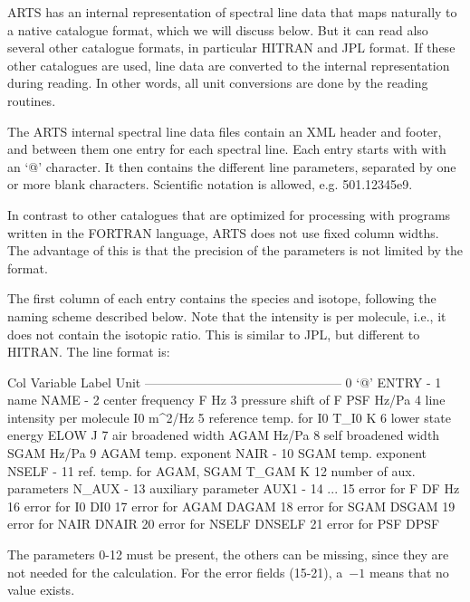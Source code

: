 ARTS has an internal representation of spectral line data that maps
naturally to a native catalogue format, which we will discuss
below. But it can read also several other catalogue formats, in
particular HITRAN and JPL format. If these other catalogues are used,
line data are converted to the internal representation during
reading. In other words, all unit conversions are done by the reading
routines.

The ARTS internal spectral line data files contain an XML header and
footer, and between them one entry for each spectral line. Each entry
starts with with an `@' character. It then contains the different line
parameters, separated by one or more blank characters. Scientific
notation is allowed, e.g. 501.12345e9.  

In contrast to other catalogues that are optimized for processing with
programs written in the FORTRAN language, ARTS does not use fixed
column widths. The advantage of this is that the precision of the
parameters is not limited by the format.

The first column of each entry contains the species and isotope,
following the naming scheme described below. Note that the intensity
is per molecule, i.e., it does not contain the isotopic ratio. This is
similar to JPL, but different to HITRAN.  The line format is:

\begin{code}

Col  Variable                     Label    Unit     
-----------------------------------------------      
 0   `@'                         ENTRY        -     
 1   name                         NAME        -     
 2   center frequency                F       Hz     
 3   pressure shift of F           PSF    Hz/Pa    
 4   line intensity per molecule    I0   m^2/Hz     
 5   reference temp. for I0       T_I0        K
 6   lower state energy           ELOW        J    
 7   air broadened width          AGAM    Hz/Pa     
 8   self broadened width         SGAM    Hz/Pa
 9   AGAM temp. exponent          NAIR        -     
10   SGAM temp. exponent         NSELF        - 
11   ref. temp. for AGAM, SGAM   T_GAM        K
12   number of aux. parameters   N_AUX        -
13   auxiliary parameter          AUX1        -
14   ... 
15   error for F                    DF       Hz
16   error for I0                  DI0        %
17   error for AGAM              DAGAM        %
18   error for SGAM              DSGAM        %
19   error for NAIR              DNAIR        %
20   error for NSELF            DNSELF        %
21   error for PSF                DPSF        %

\end{code}
The parameters 0-12 must be present, the others can be missing, since
they are not needed for the calculation. For the error fields (15-21),
a~$-1$ means that no value exists.\\

